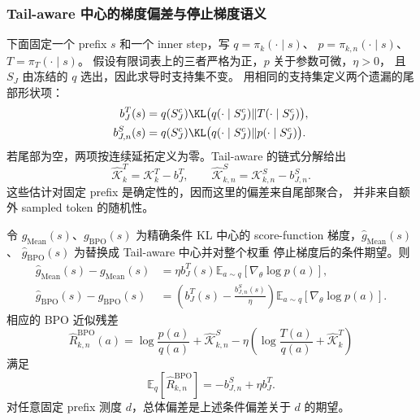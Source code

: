 \subsubsection*{Tail-aware 中心的梯度偏差与停止梯度语义}

下面固定一个 prefix $s$ 和一个 inner step，写 $q=\pi_k(\cdot\mid s)$、
$p=\pi_{k,n}(\cdot\mid s)$、$T=\pi_T(\cdot\mid s)$。
假设有限词表上的三者严格为正，$p$ 关于参数可微，$\eta>0$，
且 $S_J$ 由冻结的 $q$ 选出，因此求导时支持集不变。
用相同的支持集定义两个遗漏的尾部形状项：
\begin{align}
 b_J^T(s)&=q(S_J^c)\KL\bigl(q(\cdot\mid S_J^c)\Vert T(\cdot\mid S_J^c)\bigr),\\
 b_{J,n}^S(s)&=q(S_J^c)\KL\bigl(q(\cdot\mid S_J^c)\Vert p(\cdot\mid S_J^c)\bigr).
\end{align}
若尾部为空，两项按连续延拓定义为零。Tail-aware 的链式分解给出
\begin{equation}
 \widehat{\mathcal K}_k^T=\mathcal K_k^T-b_J^T,
 \qquad
 \widehat{\mathcal K}_{k,n}^S=\mathcal K_{k,n}^S-b_{J,n}^S.
\end{equation}
这些估计对固定 prefix 是确定性的，因而这里的偏差来自尾部聚合，
并非来自额外 sampled token 的随机性。

\begin{theorem}
\label{thm:ch2-ta-center-gradient-bias}
令 $g_{\mathrm{Mean}}(s)$、$g_{\mathrm{BPO}}(s)$ 为精确条件 KL 中心的
score-function 梯度，$\widehat g_{\mathrm{Mean}}(s)$、
$\widehat g_{\mathrm{BPO}}(s)$ 为替换成 Tail-aware 中心并对整个权重
停止梯度后的条件期望。则
\begin{align}
 \widehat g_{\mathrm{Mean}}(s)-g_{\mathrm{Mean}}(s)
 &=\eta b_J^T(s)\mathbb E_{a\sim q}[\nabla_\theta\log p(a)],\\
 \widehat g_{\mathrm{BPO}}(s)-g_{\mathrm{BPO}}(s)
 &=\left(b_J^T(s)-\frac{b_{J,n}^S(s)}{\eta}\right)
   \mathbb E_{a\sim q}[\nabla_\theta\log p(a)].
\end{align}
相应的 BPO 近似残差
\begin{equation}
 \widehat R_{k,n}^{\mathrm{BPO}}(a)
 =\log\frac{p(a)}{q(a)}+\widehat{\mathcal K}_{k,n}^S
 -\eta\left(\log\frac{T(a)}{q(a)}+\widehat{\mathcal K}_k^T\right)
\end{equation}
满足
\begin{equation}
 \mathbb E_q[\widehat R_{k,n}^{\mathrm{BPO}}]=-b_{J,n}^S+\eta b_J^T.
\end{equation}
对任意固定 prefix 测度 $d$，总体偏差是上述条件偏差关于 $d$ 的期望。
\end{theorem}

